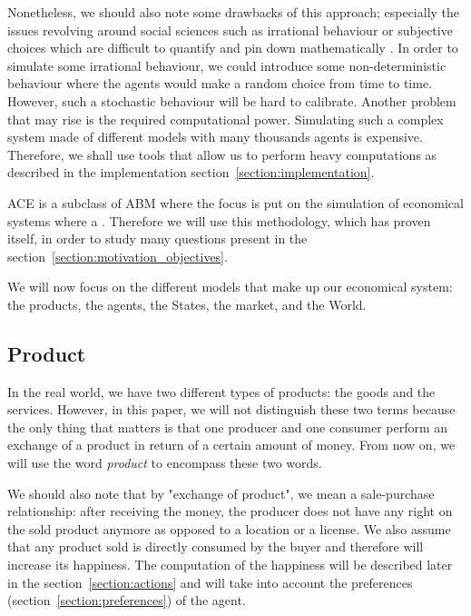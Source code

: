 \documentclass[20pt]{article}
\begin{document}
Nonetheless, we should also note some drawbacks of this approach; especially the issues revolving around social sciences such as irrational behaviour or subjective choices which are difficult to quantify and pin down mathematically \cite{ABM}. In order to simulate some irrational behaviour, we could introduce some non-deterministic behaviour where the agents would make a random choice from time to time. However, such a stochastic behaviour will be hard to calibrate. 
Another problem that may rise is the required computational power. Simulating such a complex system made of different models with many thousands agents is expensive. Therefore, we shall use tools that allow us to perform heavy computations as described in the implementation section~\ref{section:implementation}. 

ACE is a subclass of ABM where the focus is put on the simulation of economical systems where a \cite{tesfatsion_complex_adaptive_systems}. Therefore we will use this methodology, which has proven itself, in order to study many questions present in the  section~\ref{section:motivation_objectives}.

We will now focus on the different models that make up our economical system: the products, the agents, the States, the market, and the World.

\subsection{Product}\label{section:product}
In the real world, we have two different types of products: the goods and the services. However, in this paper, we will not distinguish these two terms because the only thing that matters is that one producer and one consumer perform an exchange of a product in return of a certain amount of money. From now on, we will use the word \emph{product} to encompass these two words.

We should also note that by "exchange of product", we mean a sale-purchase relationship: after receiving the money, the producer does not have any right on the sold product anymore as opposed to a location or a license. We also assume that any product sold is directly consumed by the buyer and therefore will increase its happiness. The computation of the happiness will be described later in the section~\ref{section:actions} and will take into account the preferences (section~\ref{section:preferences}) of the agent.
\end{document}
